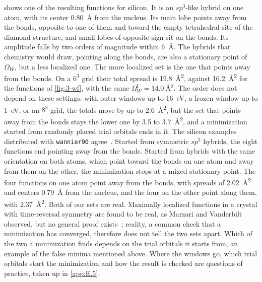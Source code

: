  shows one of the resulting functions for silicon. It is an $sp^3$-like hybrid on one atom, with its center \SI{0.80}{\angstrom} from the nucleus. Its main lobe points away from the bonds, opposite to one of them and toward the empty tetrahedral site of the diamond structure, and small lobes of opposite sign sit on the bonds. Its amplitude falls by two orders of magnitude within \SI{6}{\angstrom}. The hybrids that chemistry would draw, pointing along the bonds, are also a stationary point of $\Omega_W$, but a less localized one. The more localized set is the one that points away from the bonds. On a $6^3$ grid their total spread is \SI{19.8}{\angstrom^2}, against \SI{16.2}{\angstrom^2} for the functions of \cref{fig:3-wf}, with the same $\Omega_W^{\mathrm{I}} = \SI{14.0}{\angstrom^2}$. The order does not depend on these settings: with outer windows up to \SI{16}{eV}, a frozen window up to \SI{1}{eV}, or an $8^3$ grid, the totals move by up to \SI{2.6}{\angstrom^2}, but the set that points away from the bonds stays the lower one by 3.5 to \SI{3.7}{\angstrom^2}, and a minimization started from randomly placed trial orbitals ends in it. The silicon examples distributed with \texttt{wannier90} agree~\cite{pizzi2020wannier90}. Started from symmetric $sp^3$ hybrids, the eight functions end pointing away from the bonds. Started from hybrids with the same orientation on both atoms, which point toward the bonds on one atom and away from them on the other, the minimization stops at a mixed stationary point. The four functions on one atom point away from the bonds, with spreads of \SI{2.02}{\angstrom^2} and centers \SI{0.79}{\angstrom} from the nucleus, and the four on the other point along them, with \SI{2.37}{\angstrom^2}. Both of our sets are real. Maximally localized functions in a crystal with time-reversal symmetry are found to be real, as Marzari and Vanderbilt observed, but no general proof exists~\cite{marzari1997maximally}; reality, a common check that a minimization has converged, therefore does not tell the two sets apart. Which of the two a minimization finds depends on the trial orbitals it starts from, an example of the false minima mentioned above. Where the windows go, which trial orbitals start the minimization and how the result is checked are questions of practice, taken up in \cref{app:E.5}.

